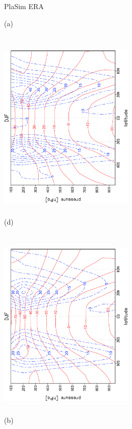 \documentclass[12pt,a4paper,twoside,openright,headinclude,liststotoc,bibtotoc]{scrreprt}
\begin{document}
\begin{figure}[H]
\hspace{4.1cm}PlaSim \hspace{7.4cm} ERA \\
\parbox{8.5cm}{\hspace{1.00cm}\begin{scriptsize}(a)\end{scriptsize} \vspace{-0.5cm} \\
\includegraphics[height=8.5cm,width=6.5cm,angle=-90]
{eps/tempuallDJF.eps}
}
\parbox{8.5cm}{\hspace{1.05cm}\begin{scriptsize}(d)\end{scriptsize} \vspace{-0.5cm} \\
\includegraphics[height=8.5cm,width=6.5cm,angle=-90]
{eps/t21tempuallDJF.eps}
}
\parbox{8.5cm}{\hspace{1.00cm}\begin{scriptsize}(b)\end{scriptsize} \vspace{-0.5cm} \\
}
\end{figure}
\end{document}

